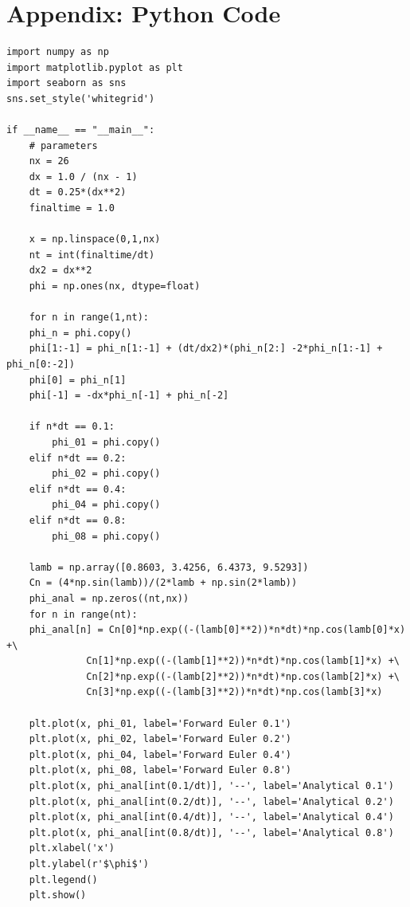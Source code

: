 \documentclass[11pt]{article}
\begin{document}
\section{Appendix: Python Code}
\label{sec-2}
\begin{verbatim}
import numpy as np
import matplotlib.pyplot as plt
import seaborn as sns
sns.set_style('whitegrid')

if __name__ == "__main__":
    # parameters
    nx = 26
    dx = 1.0 / (nx - 1)
    dt = 0.25*(dx**2)
    finaltime = 1.0

    x = np.linspace(0,1,nx)
    nt = int(finaltime/dt)
    dx2 = dx**2
    phi = np.ones(nx, dtype=float)

    for n in range(1,nt):
	phi_n = phi.copy()
	phi[1:-1] = phi_n[1:-1] + (dt/dx2)*(phi_n[2:] -2*phi_n[1:-1] + phi_n[0:-2])
	phi[0] = phi_n[1]
	phi[-1] = -dx*phi_n[-1] + phi_n[-2]

	if n*dt == 0.1:
	    phi_01 = phi.copy()
	elif n*dt == 0.2:
	    phi_02 = phi.copy()
	elif n*dt == 0.4:
	    phi_04 = phi.copy()
	elif n*dt == 0.8:
	    phi_08 = phi.copy()

    lamb = np.array([0.8603, 3.4256, 6.4373, 9.5293])
    Cn = (4*np.sin(lamb))/(2*lamb + np.sin(2*lamb))
    phi_anal = np.zeros((nt,nx))
    for n in range(nt):
	phi_anal[n] = Cn[0]*np.exp((-(lamb[0]**2))*n*dt)*np.cos(lamb[0]*x) +\
		      Cn[1]*np.exp((-(lamb[1]**2))*n*dt)*np.cos(lamb[1]*x) +\
		      Cn[2]*np.exp((-(lamb[2]**2))*n*dt)*np.cos(lamb[2]*x) +\
		      Cn[3]*np.exp((-(lamb[3]**2))*n*dt)*np.cos(lamb[3]*x)

    plt.plot(x, phi_01, label='Forward Euler 0.1')
    plt.plot(x, phi_02, label='Forward Euler 0.2')
    plt.plot(x, phi_04, label='Forward Euler 0.4')
    plt.plot(x, phi_08, label='Forward Euler 0.8')
    plt.plot(x, phi_anal[int(0.1/dt)], '--', label='Analytical 0.1')
    plt.plot(x, phi_anal[int(0.2/dt)], '--', label='Analytical 0.2')
    plt.plot(x, phi_anal[int(0.4/dt)], '--', label='Analytical 0.4')
    plt.plot(x, phi_anal[int(0.8/dt)], '--', label='Analytical 0.8')
    plt.xlabel('x')
    plt.ylabel(r'$\phi$')    
    plt.legend()
    plt.show()
\end{verbatim}
\end{document}
